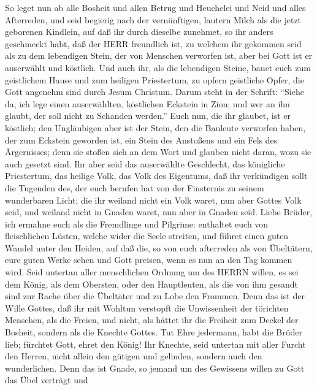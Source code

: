  So leget nun ab alle Bosheit und allen Betrug und Heuchelei
und Neid und alles Afterreden,  und seid begierig nach der
vernünftigen, lautern Milch als die jetzt geborenen Kindlein, auf daß
ihr durch dieselbe zunehmet,  so ihr anders geschmeckt habt,
daß der HERR freundlich ist,  zu welchem ihr gekommen seid
als zu dem lebendigen Stein, der von Menschen verworfen ist, aber bei
Gott ist er auserwählt und köstlich.  Und auch ihr, als die
lebendigen Steine, bauet euch zum geistlichem Hause und zum heiligen
Priestertum, zu opfern geistliche Opfer, die Gott angenehm sind durch
Jesum Christum.  Darum steht in der Schrift: ``Siehe da, ich
lege einen auserwählten, köstlichen Eckstein in Zion; und wer an ihn
glaubt, der soll nicht zu Schanden werden.''  Euch nun, die
ihr glaubet, ist er köstlich; den Ungläubigen aber ist der Stein, den
die Bauleute verworfen haben, der zum Eckstein geworden ist,
 ein Stein des Anstoßens und ein Fels des Ärgernisses; denn
sie stoßen sich an dem Wort und glauben nicht daran, wozu sie auch
gesetzt sind.  Ihr aber seid das auserwählte Geschlecht, das
königliche Priestertum, das heilige Volk, das Volk des Eigentums, daß
ihr verkündigen sollt die Tugenden des, der euch berufen hat von der
Finsternis zu seinem wunderbaren Licht;  die ihr weiland
nicht ein Volk waret, nun aber Gottes Volk seid, und weiland nicht in
Gnaden waret, nun aber in Gnaden seid.  Liebe Brüder, ich
ermahne euch als die Fremdlinge und Pilgrime: enthaltet euch von
fleischlichen Lüsten, welche wider die Seele streiten,  und
führet einen guten Wandel unter den Heiden, auf daß die, so von euch
afterreden als von Übeltätern, eure guten Werke sehen und Gott preisen,
wenn es nun an den Tag kommen wird.  Seid untertan aller
menschlichen Ordnung um des HERRN willen, es sei dem König, als dem
Obersten,  oder den Hauptleuten, als die von ihm gesandt
sind zur Rache über die Übeltäter und zu Lobe den Frommen. 
Denn das ist der Wille Gottes, daß ihr mit Wohltun verstopft die
Unwissenheit der törichten Menschen,  als die Freien, und
nicht, als hättet ihr die Freiheit zum Deckel der Bosheit, sondern als
die Knechte Gottes.  Tut Ehre jedermann, habt die Brüder
lieb; fürchtet Gott, ehret den König!  Ihr Knechte, seid
untertan mit aller Furcht den Herren, nicht allein den gütigen und
gelinden, sondern auch den wunderlichen.  Denn das ist
Gnade, so jemand um des Gewissens willen zu Gott das Übel verträgt und
